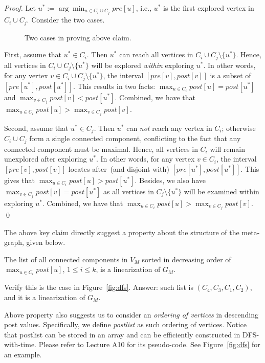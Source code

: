 \emph{Proof.} Let $u^* := \arg\min_{u\in C_i\cup C_j} pre[u]$, i.e., $u^*$ is the first explored vertex in $C_i\cup C_j$.
Consider the two cases. 

\begin{figure}[h!]
\centering{}
\caption{Two cases in proving above claim.}
\label{fig:meta}
\end{figure}

First, assume that $u^* \in C_i$. Then $u^*$ can reach all vertices in $C_i\cup C_j\setminus \{u^*\}$.
Hence, all vertices in $C_i\cup C_j\setminus \{u^*\}$ will be explored \emph{within} exploring $u^*$.
In other words, for any vertex $v\in C_i\cup C_j\setminus \{u^*\}$, the interval $[pre[v], post[v]]$
is a subset of $[pre[u^*], post[u^*]]$. This results in two facts:
$\max_{u\in C_i} post[u] = post[u^*]$ and $\max_{v\in C_j} post[v] < post[u^*]$.
Combined, we have that $\max_{u\in C_i} post[u] > \max_{v\in C_j} post[v]$.

Second, assume that $u^* \in C_j$. Then $u^*$ can \emph{not} reach any vertex in $C_i$; otherwise
$C_i\cup C_j$ form a single connected component, conflicting to the fact that any connected component must be maximal.
Hence, all vertices in $C_i$ will remain unexplored after exploring $u^*$.
In other words, for any vertex $v\in C_i$, the interval $[pre[v], post[v]]$
locates after~(and disjoint with) $[pre[u^*], post[u^*]]$. This gives that
$\max_{u\in C_i} post[u] > post[u^*]$. Besides, 
we also have $\max_{v\in C_j} post[v] = post[u^*]$ as all vertices in $C_j\setminus \{u^*\}$ will be examined within exploring $u^*$.
Combined, we have that $\max_{u\in C_i} post[u] > \max_{v\in C_j} post[v]$.
\qed

The above key claim directly suggest a property about the structure of the meta-graph, given below.

\begin{corollary}
The list of all connected components in $V_M$ sorted in decreasing order of $\max_{u\in C_i} post[u]$, $1\le i \le k$,
is a linearization of $G_M$.
\label{col1}
\end{corollary}

Verify this is the case in Figure~\ref{fig:dfs}. Answer: such list is $(C_4, C_3, C_1, C_2)$, and it is a linearization of $G_M$.

Above property also suggests us to consider an \emph{ordering of vertices} in descending post values.
Specifically, we define \emph{postlist} as such ordering of vertices.
Notice that postlist can be stored in an array and can be efficiently constructed in DFS-with-time.
Please refer to Lecture A10 for its pseudo-code.
See Figure~\ref{fig:dfs} for an example.


